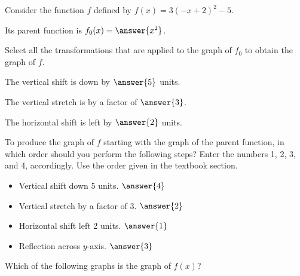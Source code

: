 \documentclass{ximera}
\author{Kenneth Berglund}
\begin{document}
\begin{exercise}
Consider the function $f$ defined by $f(x) = 3(-x + 2)^2 - 5$.

Its parent function is $f_0(x) = \answer{x^2}$. 

\begin{exercise}
Select all the transformations that are applied to the graph of $f_0$ to obtain the graph of $f$.
\begin{selectAll}
\end{selectAll}

\begin{exercise}
The vertical shift is down by $\answer{5}$ units.

The vertical stretch is by a factor of $\answer{3}$.

The horizontal shift is left by $\answer{2}$ units.

\begin{exercise}
To produce the graph of $f$ starting with the graph of the parent function, in which order should you perform the following steps? Enter the numbers 1, 2, 3, and 4, accordingly. Use the order given in the textbook section.
\begin{itemize}
\item Vertical shift down 5 units. $\answer{4}$
\item Vertical stretch by a factor of 3. $\answer{2}$
\item Horizontal shift left 2 units. $\answer{1}$
\item Reflection across $y$-axis. $\answer{3}$
\end{itemize}
Which of the following graphs is the graph of $f(x)$?


\end{exercise}
\end{exercise}
\end{exercise}
\end{exercise}
\end{document}
